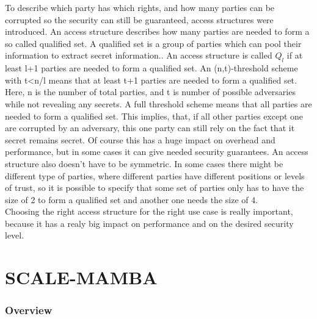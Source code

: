 \documentclass[english,runningheads,a4paper]{llncs}[2018/03/10]
\begin{document}
To describe which party has which rights, and how many parties can be corrupted so the security can still be guaranteed, access structures were introduced.
An access structure describes how many parties are needed to form a so called qualified set. A qualified set is a group of parties which can pool their information to extract secret information..  An access structure is called \(Q_l \) if at least l+1 parties are needed to  form a qualified set. 
An (n,t)-threshold scheme with t<n/l means that at least t+1 parties are needed to form a qualified set. Here, n is the number of total parties, and t is number of possible adversaries while not revealing any secrets.
A full threshold scheme means that all parties are needed to form a qualified set. This implies, that, if all other parties except one are corrupted by an adversary, this one party can still rely on the fact that it secret remains secret. Of course this has a huge impact on overhead and performance, but in some cases it can give needed security guarantees.
An access structure also doesn't have to be symmetric. In some cases there might be different type of parties, where different parties have different positions or levels of trust, so it is possible to specify that some set of parties only has to have the size of 2 to form a qualified set and another one needs the size of 4.\\
Choosing the right access structure for the right use case is really important, because it has a realy big impact on performance and on the desired security level.


\section{SCALE-MAMBA}\label{sec:scalemamba}

\subsubsection{Overview}
\end{document}
